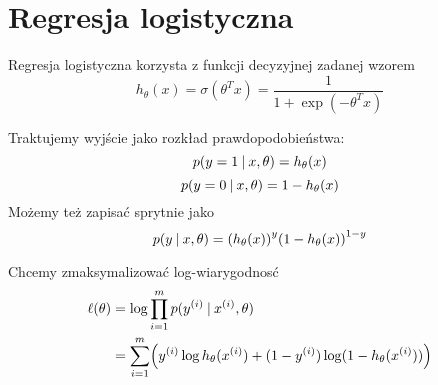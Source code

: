 \section{Regresja logistyczna}

Regresja logistyczna korzysta z funkcji decyzyjnej zadanej wzorem
\[
    h_\theta(x) = \sigma(\theta^T x) = \frac{1}{1 + \exp(-\theta^Tx)}
\]

Traktujemy wyjście jako rozkład prawdopodobieństwa:
\[
    p(y = 1 \:\vert\: x, \theta) = h_\theta(x)
\]
\[
    p(y = 0 \:\vert\: x, \theta) = 1 - h_\theta(x)
\]
Możemy też zapisać sprytnie jako
\[
    p(y \given x, \theta) = \pars{h_\theta(x)}^y\pars{1 - h_\theta(x)}^{1-y}
\]

Chcemy zmaksymalizować log-wiarygodnosć
\begin{align*}
    \ell(\theta) 
        &= \log \prod_{i=1}^m p(y^{(i)} \given x^{(i)}, \theta) \\
        &= \sum_{i=1}^m \pars{y^{(i)} \log h_\theta(x^{(i)}) + (1 - y^{(i)}) \log (1 - h_\theta(x^{(i)}))}
\end{align*}